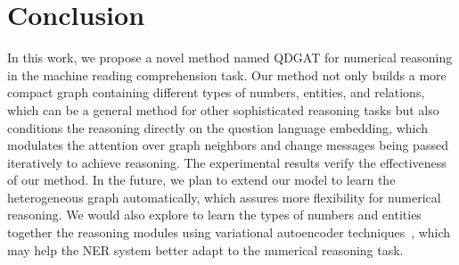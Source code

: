 \documentclass{article}
\begin{document}
\section{Conclusion}
In this work, we propose a novel method named QDGAT for numerical reasoning in the machine reading comprehension task.
Our method not only builds a more compact graph containing different types of numbers, entities, and relations, which can be a general method for other sophisticated reasoning tasks but also conditions the reasoning directly on the question language embedding, which modulates the attention over graph neighbors and change messages being passed iteratively to achieve reasoning.
The experimental results verify the effectiveness of our method. 
In the future, we plan to extend our model to learn the heterogeneous graph automatically, which assures more flexibility for numerical reasoning. We would also explore to learn the types of numbers and entities together the reasoning modules using variational autoencoder techniques~\cite{DBLP:journals/corr/KingmaW13}, which may help the NER system better adapt to the numerical reasoning task.
















\end{document}
